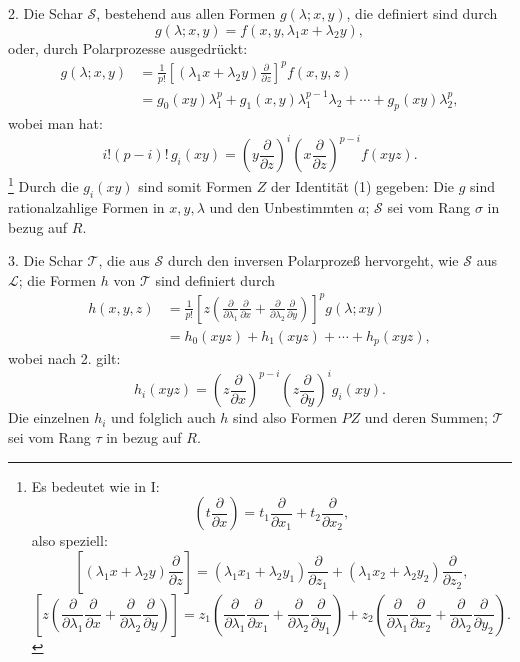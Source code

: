\documentclass[11pt]{article}
\begin{document}
2. Die Schar $\mathcal S$, bestehend aus allen Formen $g(\lambda;x,y)$, die definiert sind durch
\[
  g(\lambda;x,y)=f(x,y,\lambda_1x+\lambda_2y),
\]
oder, durch Polarprozesse ausgedrückt:
\[
\begin{aligned}
  g(\lambda;x,y)
  &=\frac1{p!}\left[(\lambda_1x+\lambda_2y)\frac{\partial}{\partial z}\right]^p f(x,y,z) \\
  &=g_0(xy)\lambda_1^p+g_1(x,y)\lambda_1^{p-1}\lambda_2+\cdots+g_p(xy)\lambda_2^p,
\end{aligned}
\]
wobei man hat:
\[
  i!(p-i)!\,g_i(xy)=
  \left(y\frac{\partial}{\partial z}\right)^i
  \left(x\frac{\partial}{\partial z}\right)^{p-i}f(xyz).
\]
\footnote{Es bedeutet wie in I:
\[
 \left(t\frac{\partial}{\partial x}\right)=t_1\frac{\partial}{\partial x_1}+t_2\frac{\partial}{\partial x_2},
\]
also speziell:
\[
 \left[(\lambda_1x+\lambda_2y)\frac{\partial}{\partial z}\right]
 = (\lambda_1x_1+\lambda_2y_1)\frac{\partial}{\partial z_1}
 + (\lambda_1x_2+\lambda_2y_2)\frac{\partial}{\partial z_2},
\]
\[
 \left[z\left(\frac{\partial}{\partial\lambda_1}\frac{\partial}{\partial x}
 +\frac{\partial}{\partial\lambda_2}\frac{\partial}{\partial y}\right)\right]
 =z_1\left(\frac{\partial}{\partial\lambda_1}\frac{\partial}{\partial x_1}
 +\frac{\partial}{\partial\lambda_2}\frac{\partial}{\partial y_1}\right)
 +z_2\left(\frac{\partial}{\partial\lambda_1}\frac{\partial}{\partial x_2}
 +\frac{\partial}{\partial\lambda_2}\frac{\partial}{\partial y_2}\right).
\]}
Durch die $g_i(xy)$ sind somit Formen $Z$ der Identität (1) gegeben: Die $g$ sind rationalzahlige Formen in $x,y,\lambda$ und den Unbestimmten $a$; $\mathcal S$ sei vom Rang $\sigma$ in bezug auf $R$.

3. Die Schar $\mathcal T$, die aus $\mathcal S$ durch den inversen Polarprozeß hervorgeht, wie $\mathcal S$ aus $\mathcal L$; die Formen $h$ von $\mathcal T$ sind definiert durch
\[
\begin{aligned}
 h(x,y,z)
 &=\frac1{p!}\left[z\left(\frac{\partial}{\partial\lambda_1}\frac{\partial}{\partial x}
 +\frac{\partial}{\partial\lambda_2}\frac{\partial}{\partial y}\right)\right]^p g(\lambda;xy)\\
 &=h_0(xyz)+h_1(xyz)+\cdots+h_p(xyz),
\end{aligned}
\]
wobei nach 2. gilt:
\[
  h_i(xyz)=
  \left(z\frac{\partial}{\partial x}\right)^{p-i}
  \left(z\frac{\partial}{\partial y}\right)^i g_i(xy).
\]
Die einzelnen $h_i$ und folglich auch $h$ sind also Formen $PZ$ und deren Summen; $\mathcal T$ sei vom Rang $\tau$ in bezug auf $R$.
\end{document}
